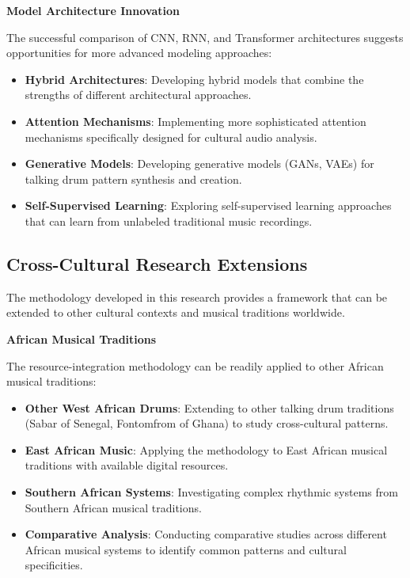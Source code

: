 \documentclass[12pt,a4paper]{article}
\begin{document}
\textbf{Model Architecture Innovation}

The successful comparison of CNN, RNN, and Transformer architectures suggests opportunities for more advanced modeling approaches:

\begin{itemize}
\item \textbf{Hybrid Architectures}: Developing hybrid models that combine the strengths of different architectural approaches.
\item \textbf{Attention Mechanisms}: Implementing more sophisticated attention mechanisms specifically designed for cultural audio analysis.
\item \textbf{Generative Models}: Developing generative models (GANs, VAEs) for talking drum pattern synthesis and creation.
\item \textbf{Self-Supervised Learning}: Exploring self-supervised learning approaches that can learn from unlabeled traditional music recordings.
\end{itemize}

\subsection{Cross-Cultural Research Extensions}

The methodology developed in this research provides a framework that can be extended to other cultural contexts and musical traditions worldwide.

\textbf{African Musical Traditions}

The resource-integration methodology can be readily applied to other African musical traditions:

\begin{itemize}
\item \textbf{Other West African Drums}: Extending to other talking drum traditions (Sabar of Senegal, Fontomfrom of Ghana) to study cross-cultural patterns.
\item \textbf{East African Music}: Applying the methodology to East African musical traditions with available digital resources.
\item \textbf{Southern African Systems}: Investigating complex rhythmic systems from Southern African musical traditions.
\item \textbf{Comparative Analysis}: Conducting comparative studies across different African musical systems to identify common patterns and cultural specificities.
\end{itemize}
\end{document}
